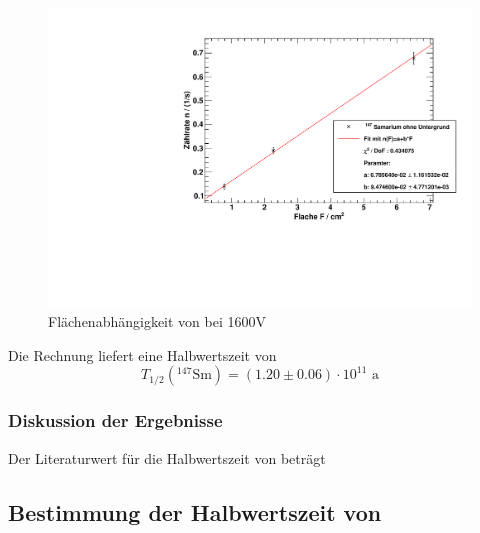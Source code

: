 \begin{figure}[H]
\begin{center}
  \includegraphics[width=15cm]{../img/Samarium147-Flaechenabhaengigkeit.pdf}
  \caption[Flächenabhängigkeit von \samarium]{Flächenabhängigkeit von \samarium bei 1600V}
  \label{img:samarium:areafit}
\end{center}
\end{figure}
Die Rechnung liefert eine Halbwertszeit von
\begin{equation}
  T_{1/2}({}^{147}\text{Sm}) = (1.20 \pm 0.06) \cdot 10^{11} \text{ a}
\end{equation}

\subsubsection{Diskussion der Ergebnisse}
Der Literaturwert für die Halbwertszeit von \samarium beträgt 

\subsection{Bestimmung der Halbwertszeit von \kalium}
